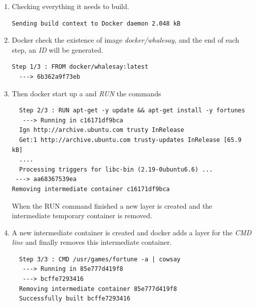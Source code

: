 \documentclass[12pt,a4paper]{article}
\begin{document}
\begin{enumerate}
  \item Checking everything it needs to build.\\
  \begin{verbatim}
Sending build context to Docker daemon 2.048 kB
  \end{verbatim}
\FloatBarrier
  \item Docker check the existence of image \emph{docker/whalesay}, and the end of each step, an \emph{ID} will be generated.\\
  \begin{verbatim}
Step 1/3 : FROM docker/whalesay:latest
  ---> 6b362a9f73eb
  \end{verbatim}
  \FloatBarrier
  \item Then docker start up a {} and \emph{RUN} the commands \\
  \begin{verbatim}
  Step 2/3 : RUN apt-get -y update && apt-get install -y fortunes
   ---> Running in c16171df9bca
  Ign http://archive.ubuntu.com trusty InRelease
  Get:1 http://archive.ubuntu.com trusty-updates InRelease [65.9 kB]
  ....
  Processing triggers for libc-bin (2.19-0ubuntu6.6) ...
 ---> aa68367539ea
Removing intermediate container c16171df9bca
  \end{verbatim}
  \FloatBarrier
  When the RUN command finished a new layer is created and the intermediate temporary container is removed.
  \item A new intermediate container is created and docker adds a layer for the \emph{CMD line} and finally removes this intermediate container.\\
  \begin{verbatim}
  Step 3/3 : CMD /usr/games/fortune -a | cowsay
   ---> Running in 85e777d419f8
   ---> bcffe7293416
  Removing intermediate container 85e777d419f8
  Successfully built bcffe7293416
  \end{verbatim}
  \FloatBarrier

\end{enumerate}
\end{document}
